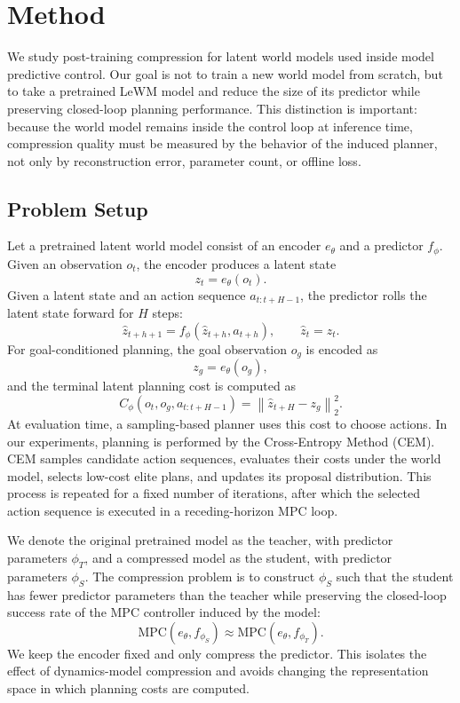 \documentclass[11pt]{article}
\begin{document}
\section{Method}
\label{sec:method}

We study post-training compression for latent world models used inside model predictive control. Our goal is not to train a new world model from scratch, but to take a pretrained LeWM model and reduce the size of its predictor while preserving closed-loop planning performance. This distinction is important: because the world model remains inside the control loop at inference time, compression quality must be measured by the behavior of the induced planner, not only by reconstruction error, parameter count, or offline loss.

\subsection{Problem Setup}
\label{sec:problem_setup}

Let a pretrained latent world model consist of an encoder $e_\theta$ and a predictor $f_\phi$. Given an observation $o_t$, the encoder produces a latent state
\[
    z_t = e_\theta(o_t).
\]
Given a latent state and an action sequence $a_{t:t+H-1}$, the predictor rolls the latent state forward for $H$ steps:
\[
    \hat z_{t+h+1}
    =
    f_\phi(\hat z_{t+h}, a_{t+h}),
    \qquad
    \hat z_t = z_t.
\]
For goal-conditioned planning, the goal observation $o_g$ is encoded as
\[
    z_g = e_\theta(o_g),
\]
and the terminal latent planning cost is computed as
\[
    C_\phi(o_t, o_g, a_{t:t+H-1})
    =
    \left\lVert \hat z_{t+H} - z_g \right\rVert_2^2.
\]
At evaluation time, a sampling-based planner uses this cost to choose actions. In our experiments, planning is performed by the Cross-Entropy Method (CEM). CEM samples candidate action sequences, evaluates their costs under the world model, selects low-cost elite plans, and updates its proposal distribution. This process is repeated for a fixed number of iterations, after which the selected action sequence is executed in a receding-horizon MPC loop.

We denote the original pretrained model as the teacher, with predictor parameters $\phi_T$, and a compressed model as the student, with predictor parameters $\phi_S$. The compression problem is to construct $\phi_S$ such that the student has fewer predictor parameters than the teacher while preserving the closed-loop success rate of the MPC controller induced by the model:
\[
    \mathrm{MPC}(e_\theta, f_{\phi_S})
    \approx
    \mathrm{MPC}(e_\theta, f_{\phi_T}).
\]
We keep the encoder fixed and only compress the predictor. This isolates the effect of dynamics-model compression and avoids changing the representation space in which planning costs are computed.
\end{document}
